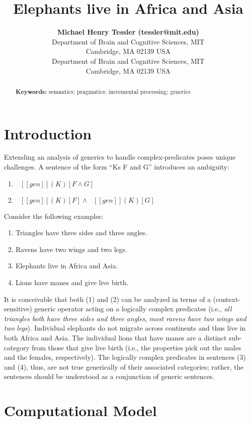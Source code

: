 \documentclass[10pt,letterpaper]{article}
\title{Elephants live in Africa and Asia}
\author{{\large \bf Michael Henry Tessler (tessler@mit.edu)} \\
  Department of Brain and Cognitive Sciences, MIT \\
  Cambridge, MA 02139 USA
  \AND {\large \bf Roger Levy (SDJ@Macc.Wisc.Edu)} \\
  Department of Brain and Cognitive Sciences, MIT \\
  Cambridge, MA 02139 USA}
\providecommand{\tightlist}{%
  \setlength{\itemsep}{0pt}\setlength{\parskip}{0pt}}
\newcommand{\denote}[1]{\mbox{ $[\![ #1 ]\!]$}}
\begin{document}
\maketitle


\begin{abstract}

\textbf{Keywords:} 
semantics; pragmatics; incremental processing; generics
\end{abstract}


\section{Introduction}

Extending an analysis of generics to handle complex-predicates poses unique challenges.
A sentence of the form ``Ks F and G'' introduces an ambiguity:

\begin{enumerate}
\item $\denote{gen}(K) [F \land G]$
\item $\denote{gen}(K) [F] \land \denote{gen}(K) [G]$
\end{enumerate}

Consider the following examples:

\begin{enumerate}
\tightlist
\item Triangles have three sides and three angles.
\item Ravens have two wings and two legs.
\item Elephants live in Africa and Asia.
\item Lions have manes and give live birth.
\end{enumerate}

It is conceivable that both (1) and (2) can be analyzed in terms of a (context-sensitive) generic operator acting on a logically complex predicates (i.e., \emph{all triangles both have three sides and three angles}, \emph{most ravens have two wings and two legs}). 
Individual elephants do not migrate across continents and thus live in both Africa and Asia. 
The individual lions that have manes are a distinct sub-category from those that give live birth (i.e., the properties pick out the males and the females, respectively). 
The logically complex predicates in sentences (3) and (4), thus, are not true generically of their associated categories; rather, the sentences should be understood as a conjunction of generic sentences.

\section{Computational Model}
\end{document}
